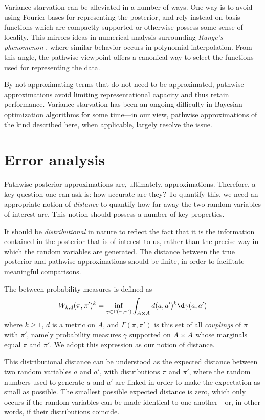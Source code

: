\documentclass[11pt]{book}
\begin{document}
Variance starvation can be alleviated in a number of ways.
One way is to avoid using Fourier bases for representing the posterior, and rely instead on basis functions which are compactly supported or otherwise possess some sense of locality.
This mirrors ideas in numerical analysis surrounding \emph{Runge's phenomenon} \cite{epperson87,dahlquist08}, where similar behavior occurs in polynomial interpolation.
From this angle, the pathwise viewpoint offers a canonical way to select the functions used for representing the data.

By not approximating terms that do not need to be approximated, pathwise approximations avoid limiting representational capacity and thus retain performance.
Variance starvation has been an ongoing difficulty in Bayesian optimization algorithms for some time---in our view, pathwise approximations of the kind described here, when applicable, largely resolve the issue.


\section{Error analysis}

Pathwise posterior approximations are, ultimately, approximations.
Therefore, a key question one can ask is: how accurate are they?
To quantify this, we need an appropriate notion of \emph{distance} to quantify how far away the two random variables of interest are.
This notion should possess a number of key properties.

\1  It should be \emph{distributional} in nature to reflect the fact that it is the information contained in the posterior that is of interest to us, rather than the precise way in which the random variables are generated.
\2 The distance between the true posterior and pathwise approximations should be finite, in order to facilitate meaningful comparisons.
\0 

The  \cite{villani08} between probability measures is defined as 
\[
W_{k,d}(\pi,\pi')^k = \inf_{\gamma\in\Gamma(\pi,\pi')} \int_{A\x A} d(a,a')^k \d\gamma(a,a')
\]
where $k \geq 1$, $d$ is a metric on $A$, and $\Gamma(\pi,\pi')$ is this set of all \emph{couplings} of $\pi$ with $\pi'$, namely probability measures $\gamma$ supported on $A\times A$ whose marginals equal $\pi$ and $\pi'$.
We adopt this expression as our notion of distance.

This distributional distance can be understood as the expected distance between two random variables $a$ and $a'$, with distributions $\pi$ and $\pi'$, where the random numbers used to generate $a$ and $a'$ are linked in order to make the expectation as small as possible.
The smallest possible expected distance is zero, which only occurs if the random variables can be made identical to one another---or, in other words, if their distributions coincide.
\end{document}
